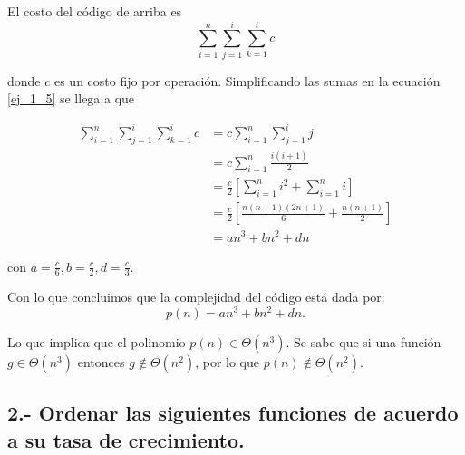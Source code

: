 \documentclass{article}
\begin{document}
\begin{enumerate}
    El costo del código de arriba es 
    \begin{equation}
    \label{ej_1_5}
    \sum_{i = 1}^n \sum_{j = 1}^i \sum_{k = 1}^i c    
    \end{equation}
    
    donde $c$ es un costo fijo por operación. Simplificando las sumas en la ecuación \ref{ej_1_5} se llega a que

    \begin{align}
        \sum_{i = 1}^n \sum_{j = 1}^i \sum_{k = 1}^i c &= 
        c \sum_{i = 1}^n \sum_{j = 1}^i j \\
        &=  c \sum_{i = 1}^n \frac{i(i + 1)}{2} \\
        &= \frac{c}{2} \left[ \sum_{i = 1}^n i^2 + \sum_{i = 1}^n i \right] \\
        &= \frac{c}{2} \left[ \frac{n(n + 1)(2n + 1)}{6} + \frac{n(n+1)}{2} \right] \\
        &= an^3 + bn^2 + dn
    \end{align}
    
    con $a = \frac{c}{6}, b = \frac{c}{2}, d = \frac{c}{3}$.
    
    
    Con lo que concluimos que la complejidad del código está dada por:
    \[ 
    p(n) = an^3 + bn^2 + dn.
    \]
    
    Lo que implica que el polinomio $p(n) \in \Theta(n^3)$. Se sabe que si una función $g \in \Theta(n^3)$ entonces $g \notin \Theta(n^2)$, por lo que $p(n) \notin \Theta(n^2)$.
    
\end{enumerate}



\subsection*{2.- Ordenar las siguientes funciones de acuerdo a su tasa de crecimiento.}
\end{document}

